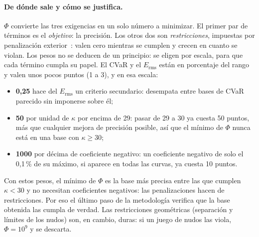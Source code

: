 \paragraph{De dónde sale y cómo se justifica.} $\Phi$ convierte las tres exigencias en un solo número a minimizar. El primer par de términos es el \emph{objetivo}: la precisión. Los otros dos son \emph{restricciones}, impuestas por penalización exterior~\cite{nocedal}: valen cero mientras se cumplen y crecen en cuanto se violan. Los pesos no se deducen de un principio: se eligen por escala, para que cada término cumpla su papel. El CVaR y el $E_{\mathrm{rms}}$ están en porcentaje del rango y valen unos pocos puntos (1 a 3), y en esa escala:
\begin{itemize}
\item \textbf{0,25} hace del $E_{\mathrm{rms}}$ un criterio secundario: desempata entre bases de CVaR parecido sin imponerse sobre él;
\item \textbf{50} por unidad de $\kappa$ por encima de 29: pasar de 29 a 30 ya cuesta 50 puntos, más que cualquier mejora de precisión posible, así que el mínimo de $\Phi$ nunca está en una base con $\kappa\ge30$;
\item \textbf{1000} por décima de coeficiente negativo: un coeficiente negativo de solo el 0,1\,\% de su máximo, si aparece en todas las curvas, ya cuesta 10 puntos.
\end{itemize}
Con estos pesos, el mínimo de $\Phi$ es la base más precisa entre las que cumplen $\kappa<30$ y no necesitan coeficientes negativos: las penalizaciones hacen de restricciones. Por eso el último paso de la metodología verifica que la base obtenida las cumpla de verdad. Las restricciones geométricas (separación y límites de los nudos) son, en cambio, duras: si un juego de nudos las viola, $\Phi=10^{9}$ y se descarta.

